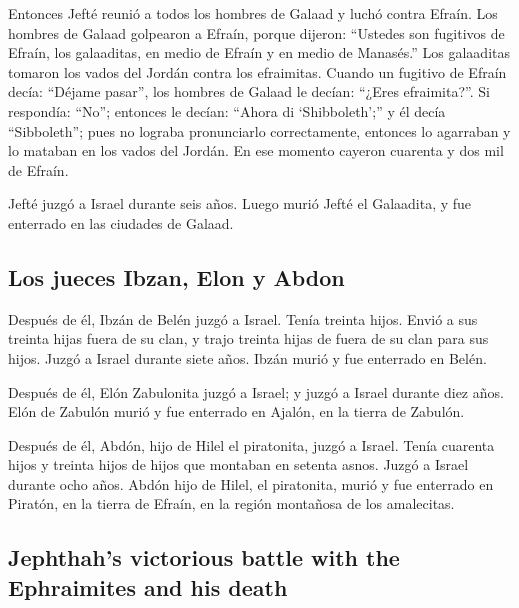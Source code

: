 \begin{paracol}{2}
 Entonces Jefté reunió a todos los hombres de Galaad y
luchó contra Efraín. Los hombres de Galaad golpearon a Efraín, porque
dijeron: ``Ustedes son fugitivos de Efraín, los galaaditas, en medio de
Efraín y en medio de Manasés.''  Los galaaditas tomaron
los vados del Jordán contra los efraimitas. Cuando un fugitivo de Efraín
decía: ``Déjame pasar'', los hombres de Galaad le decían: ``¿Eres
efraimita?''. Si respondía: ``No'';  entonces le decían:
``Ahora di `Shibboleth';'' y él decía ``Sibboleth''; pues no lograba
pronunciarlo correctamente, entonces lo agarraban y lo mataban en los
vados del Jordán. En ese momento cayeron cuarenta y dos mil de Efraín.

 Jefté juzgó a Israel durante seis años. Luego murió Jefté
el Galaadita, y fue enterrado en las ciudades de Galaad.

\hypertarget{los-jueces-ibzan-elon-y-abdon}{%
\subsection{Los jueces Ibzan, Elon y
Abdon}\label{los-jueces-ibzan-elon-y-abdon}}

 Después de él, Ibzán de Belén juzgó a Israel.
 Tenía treinta hijos. Envió a sus treinta hijas fuera de
su clan, y trajo treinta hijas de fuera de su clan para sus hijos. Juzgó
a Israel durante siete años.  Ibzán murió y fue enterrado
en Belén.

 Después de él, Elón Zabulonita juzgó a Israel; y juzgó a
Israel durante diez años.  Elón de Zabulón murió y fue
enterrado en Ajalón, en la tierra de Zabulón.

 Después de él, Abdón, hijo de Hilel el piratonita, juzgó
a Israel.  Tenía cuarenta hijos y treinta hijos de hijos
que montaban en setenta asnos. Juzgó a Israel durante ocho años.
 Abdón hijo de Hilel, el piratonita, murió y fue
enterrado en Piratón, en la tierra de Efraín, en la región montañosa de
los amalecitas.

\switchcolumn
\begin{otherlanguage}{english}

\hypertarget{jephthahs-victorious-battle-with-the-ephraimites-and-his-death}{%
\subsection{Jephthah's victorious battle with the Ephraimites and his
death}\label{jephthahs-victorious-battle-with-the-ephraimites-and-his-death}}


\end{otherlanguage}
\end{paracol}
